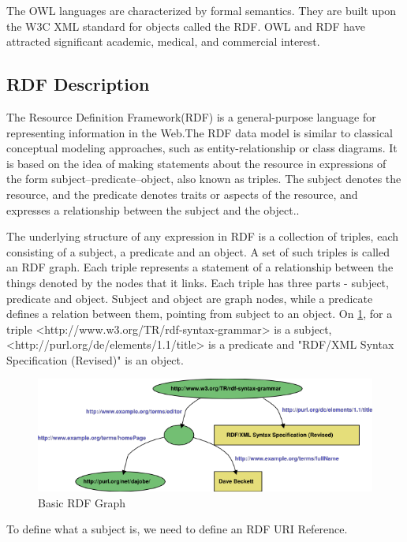\documentclass[thesis=M,english,hidelinks]{FITthesis}[2019/12/23]
\begin{document}
The OWL languages are characterized by formal semantics. They are built upon the \gls{W3C} XML standard for objects called the \gls{RDF}. OWL and RDF have attracted significant academic, medical, and commercial interest.

\subsection{RDF Description}\label{rdf-description}

The Resource Definition Framework(RDF) is a general-purpose language for representing information in the Web\cite{roussey2011}.The \gls{RDF} data model is similar to classical conceptual modeling approaches, such as entity-relationship or class diagrams. It is based on the idea of making statements about the resource in expressions of the form subject–predicate–object, also known as triples. The subject denotes the resource, and the predicate denotes traits or aspects of the resource, and expresses a relationship between the subject and the object.\cite{rdf_syntax}.

The underlying structure of any expression in RDF is a collection of triples, each consisting of a subject, a predicate and an object. A set of such triples is called an RDF graph. Each triple represents a statement of a relationship between the things denoted by the nodes that it links. Each triple has three parts - subject, predicate and object\cite{rdf_concepts}. Subject and object are graph nodes, while a predicate defines a relation between them, pointing from subject to an object. On \ref{fig:basicrdfgraph}, for a triple <http://www.w3.org/TR/rdf-syntax-grammar> is a subject, <http://purl.org/de/elements/1.1/title> is a predicate and "RDF/XML Syntax Specification (Revised)" is an object.

\begin{figure}
	\centering
	\includegraphics[width=0.7\linewidth]{basic_rdf_graph}
	\caption{Basic RDF Graph}
	\label{fig:basicrdfgraph}
\end{figure}

To define what a subject is, we need to define an \gls{RDF} \gls{URI} Reference.
\end{document}
